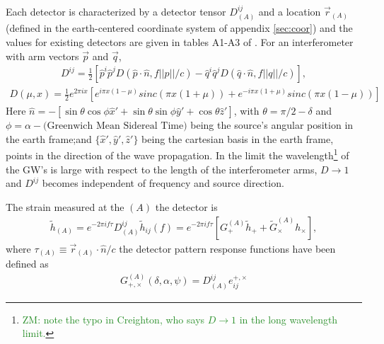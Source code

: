 \documentclass[aps,prd,amsmath,showpacs,amssymb,superscriptaddress,nofootinbib,longbibliography,eqsecnum,preprintnumbers]{revtex4-1}
\newcommand{\zach}[1]{\textcolor{ForestGreen}{#1}}
\begin{document}
Each detector is characterized by a detector tensor $D_{(A)}^{ij}$ and a location $\vec r_{(A)}$ (defined in the earth-centered coordinate system of appendix \ref{sec:coor}) and the values for existing detectors are given in tables A1-A3 of \cite{Creighton:2011zz}. For an interferometer with arm vectors $\vec p$ and $\vec q$,
\begin{align}
D^{ij}=\frac{1}{2}\left [\hat p^i\hat p^jD(\hat p \cdot \hat n, f||p||/c)-\hat q^i\hat q^jD(\hat q \cdot \hat n, f||q||/c)\right],
\end{align}
\begin{align}
D(\mu,x)=\frac{1}{2}e^{2\pi ix}\left[e^{i\pi x(1-\mu)}sinc(\pi x(1+\mu))+e^{-i\pi x(1+\mu)}sinc(\pi x(1-\mu))\right]
\end{align}
Here $\hat n= -[\sin\theta \cos\phi \hat x'+\sin\theta \sin\phi \hat y'+\cos\theta \hat z']$, with $\theta =\pi/2-\delta$ and $\phi=\alpha -\text{(Greenwich Mean Sidereal Time)}$ being the source's angular position in the earth frame;and $\{\hat x',\hat y',\hat z'\}$ being the cartesian basis in the earth frame, points in the direction of the wave propagation.
In the limit the wavelength\footnote{\zach{ZM: note the typo in Creighton, who says $D\to 1$ in the long wavelength limit.}} of the GW's is large with respect to the length of the interferometer arms, $D\to 1$ and $D^{ij}$ becomes independent of frequency and source direction.

The strain measured at the $(A)$ the detector is
\begin{align}
\tilde h_{(A)}=e^{-2\pi i f \tau}D_{(A)}^{ij}\tilde h_{ij}(f)=e^{-2\pi i f \tau}\left[G^{(A)}_+\tilde h_++\tilde G^{(A)}_\times h_\times\right],
\end{align}
where $\tau_{(A)} \equiv \vec r_{(A)}\cdot \hat n/c$ the detector pattern response functions have been defined as
\begin{align}
G^{(A)}_{+,\times}(\delta, \alpha ,\psi)=D_{(A)}^{ij}e^{+,\times}_{ij}
\end{align}
\end{document}
